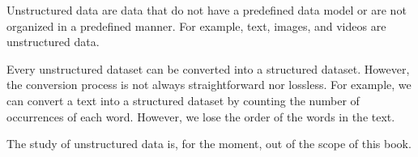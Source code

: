 Unstructured data are data that do not have a predefined data model or are not organized
in a predefined manner.  For example, text, images, and videos are unstructured data.

Every unstructured dataset can be converted into a structured dataset.  However, the
conversion process is not always straightforward nor lossless.  For example, we can
convert a text into a structured dataset by counting the number of occurrences of each
word.  However, we lose the order of the words in the text.

The study of unstructured data is, for the moment, out of the scope of this book.

